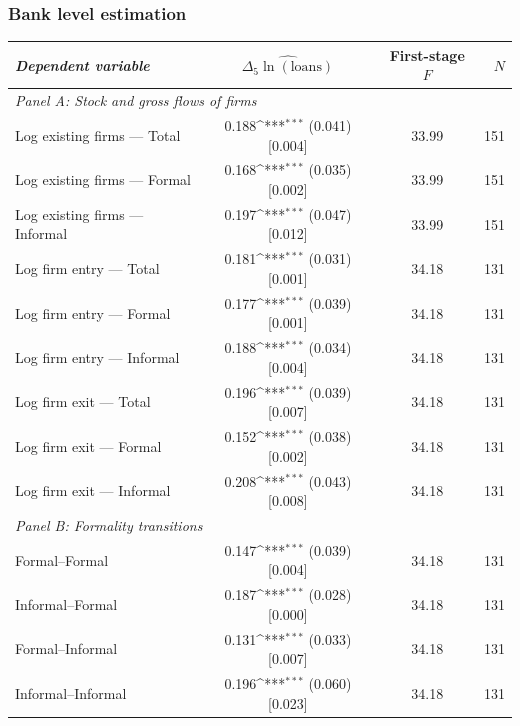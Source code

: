 \documentclass[aspectratio=169]{beamer}
\newcommand{\sym}[1]{\ifmmode^{#1}\else\(^{#1}\)\fi}
\begin{document}

\begin{frame}[noframenumbering]
\frametitle{\textbf{Bank level estimation}} \label{banklevel}

\begin{center}
    \scriptsize
    \begin{tabular}{lccr}
        \toprule
        \textit{Dependent variable} & $\widehat{\Delta_5\ln(\text{loans})}$ & First-stage $F$ & $N$ \\
        \midrule
        \multicolumn{4}{l}{\textit{Panel A: Stock and gross flows of firms}} \\
        Log existing firms --- Total     & \phantom{$-$}0.188\sym{***} (0.041) [0.004] & 33.99 & 151 \\
        Log existing firms --- Formal    & \phantom{$-$}0.168\sym{***} (0.035) [0.002] & 33.99 & 151 \\
        Log existing firms --- Informal  & \phantom{$-$}0.197\sym{***} (0.047) [0.012] & 33.99 & 151 \\
        Log firm entry --- Total         & \phantom{$-$}0.181\sym{***} (0.031) [0.001] & 34.18 & 131 \\
        Log firm entry --- Formal        & \phantom{$-$}0.177\sym{***} (0.039) [0.001] & 34.18 & 131 \\
        Log firm entry --- Informal      & \phantom{$-$}0.188\sym{***} (0.034) [0.004] & 34.18 & 131 \\
        Log firm exit --- Total          & \phantom{$-$}0.196\sym{***} (0.039) [0.007] & 34.18 & 131 \\
        Log firm exit --- Formal         & \phantom{$-$}0.152\sym{***} (0.038) [0.002] & 34.18 & 131 \\
        Log firm exit --- Informal       & \phantom{$-$}0.208\sym{***} (0.043) [0.008] & 34.18 & 131 \\
        \midrule
        \multicolumn{4}{l}{\textit{Panel B: Formality transitions}} \\
        Formal--Formal                   & \phantom{$-$}0.147\sym{***} (0.039) [0.004] & 34.18 & 131 \\
        Informal--Formal                 & \phantom{$-$}0.187\sym{***} (0.028) [0.000] & 34.18 & 131 \\
        Formal--Informal                 & \phantom{$-$}0.131\sym{***} (0.033) [0.007] & 34.18 & 131 \\
        Informal--Informal               & \phantom{$-$}0.196\sym{***} (0.060) [0.023] & 34.18 & 131 \\
        \bottomrule
    \end{tabular}
\end{center}

\hyperlink{robustness}{}

\end{frame}
\end{document}
